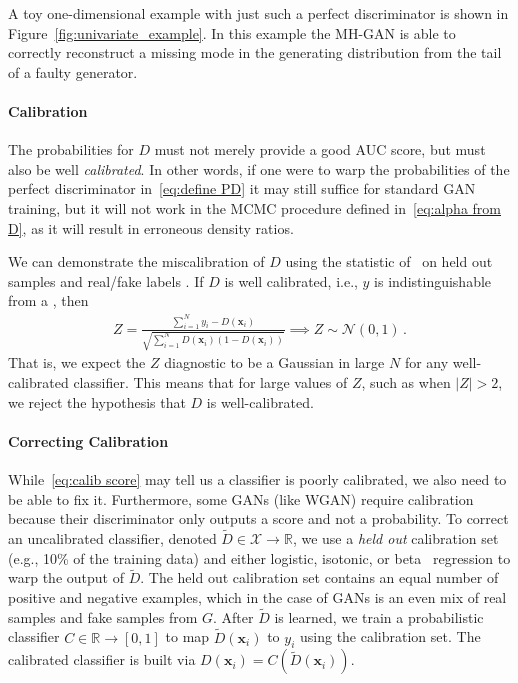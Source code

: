 \documentclass{article}
\renewcommand{\vec}[1]{{\boldsymbol{\mathbf{#1}}}} %
\newcommand{\R}{\mathbb{R}}
\newcommand{\set}[1]{\mathcal{#1}}
\newcommand{\sample}{\sim}
\newcommand{\norm}{\mathcal{N}}
\newcommand{\bern}{\textrm{Bern}}
\newcommand{\setx}{\set{X}}
\begin{document}
A toy one-dimensional example with just such a perfect discriminator is shown in Figure~\ref{fig:univariate_example}.
In this example the MH-GAN is able to correctly reconstruct a missing mode in the generating distribution from the tail of a faulty generator.

\paragraph{Calibration}
The probabilities for $D$ must not merely provide a good AUC score, but must also be well \emph{calibrated}.
In other words, if one were to warp the probabilities of the perfect discriminator in~\eqref{eq:define PD} it may still suffice for standard GAN training, but it will not work in the MCMC procedure defined in~\eqref{eq:alpha from D}, as it will result in erroneous density ratios.

We can demonstrate the miscalibration of $D$ using the statistic of~\citet{Dawid1997} on held out samples \smash{$\vec x_{1:N}$} and real/fake labels .
If $D$ is well calibrated, i.e., $y$ is indistinguishable from a \smash{$y \sample \bern(D(\vec x))$}, then
\begin{align}
  Z = \frac{\sum_{i=1}^N y_i - D(\vec x_i)}{\sqrt{\sum_{i=1}^N D(\vec x_i) (1 - D(\vec x_i))}} \!\!\implies\!\! Z \sample \norm(0,1)\,. \label{eq:calib score}
\end{align}
That is, we expect the $Z$ diagnostic to be a Gaussian in large $N$ for any well-calibrated classifier.
This means that for large values of $Z$, such as when $|Z| > 2$, we reject the hypothesis that $D$ is well-calibrated.

\paragraph{Correcting Calibration}
While~\eqref{eq:calib score} may tell us a classifier is poorly calibrated, we also need to be able to fix it.
Furthermore, some GANs (like WGAN) require calibration because their discriminator only outputs a score and not a probability.
To correct an uncalibrated classifier, denoted $\tilde{D} \in \setx \rightarrow \R$, we use a \emph{held out} calibration set (e.g., 10\% of the training data) and either logistic, isotonic, or beta~\citep{Kull2017} regression to warp the output of $\tilde{D}$.
The held out calibration set contains an equal number of positive and negative examples, which in the case of GANs is an even mix of real samples and fake samples from $G$.
After $\tilde{D}$ is learned, we train a probabilistic classifier $C \in \R \rightarrow [0,1]$ to map $\tilde{D}(\vec x_i)$ to $y_i$ using the calibration set.
The calibrated classifier is built via $D(\vec x_i) = C(\tilde{D}(\vec x_i))$.
\end{document}
